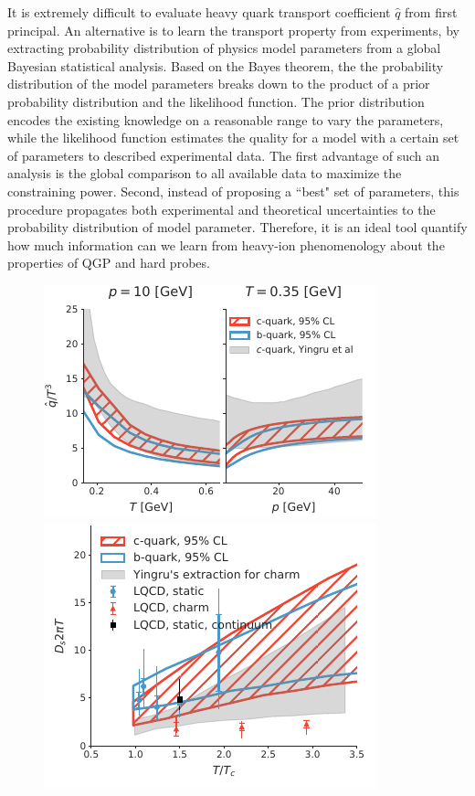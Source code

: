 \documentclass[10pt,a4paper]{article}
\begin{document}
It is extremely difficult to evaluate heavy quark transport coefficient $\hat{q}$ from first principal. 
An alternative is to learn the transport property from experiments, by extracting probability distribution of physics model parameters from a global Bayesian statistical analysis.
Based on the Bayes theorem, the the probability distribution of the model parameters breaks down to the product of a prior probability distribution and the likelihood function.
The prior distribution encodes the existing knowledge on a reasonable range to vary the parameters, while the likelihood function estimates the quality for a model with a certain set of parameters to described experimental data.
The first advantage of such an analysis is the global comparison to all available data to maximize the constraining power.
Second, instead of proposing a ``best" set of parameters, this procedure propagates both experimental and theoretical uncertainties to the probability distribution of model parameter.
Therefore, it is an ideal tool quantify how much information can we learn from heavy-ion phenomenology about the properties of QGP and hard probes.

\begin{figure}
\begin{center}
\includegraphics[width=.53\textwidth]{qhat_p_T.pdf}
\includegraphics[width=.46\textwidth]{Ds_posterior.pdf}
\caption{}
\end{center}
\end{figure}
\end{document}
